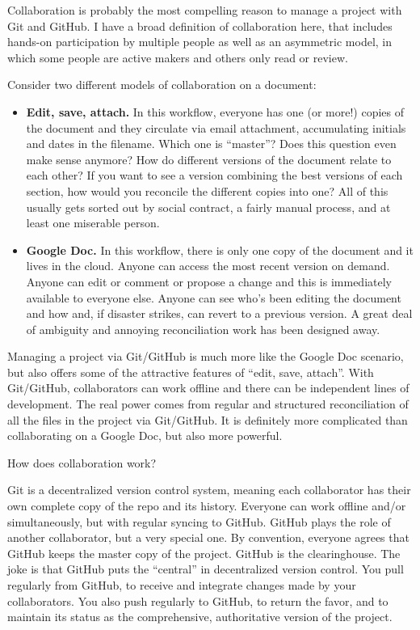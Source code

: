 \documentclass[12pt]{article}
\begin{document}
Collaboration is probably the most compelling reason to manage a project
with Git and GitHub. I have a broad definition of collaboration here,
that includes hands-on participation by multiple people as well as an
asymmetric model, in which some people are active makers and others only
read or review.

Consider two different models of collaboration on a document:

\begin{itemize}
\item
  \textbf{Edit, save, attach.} In this workflow, everyone has one (or
  more!) copies of the document and they circulate via email attachment,
  accumulating initials and dates in the filename. Which one is
  ``master''? Does this question even make sense anymore? How do
  different versions of the document relate to each other? If you want
  to see a version combining the best versions of each section, how
  would you reconcile the different copies into one? All of this usually
  gets sorted out by social contract, a fairly manual process, and at
  least one miserable person.
\item
  \textbf{Google Doc.} In this workflow, there is only one copy of the
  document and it lives in the cloud. Anyone can access the most recent
  version on demand. Anyone can edit or comment or propose a change and
  this is immediately available to everyone else. Anyone can see who's
  been editing the document and how and, if disaster strikes, can revert
  to a previous version. A great deal of ambiguity and annoying
  reconciliation work has been designed away.
\end{itemize}

Managing a project via Git/GitHub is much more like the Google Doc
scenario, but also offers some of the attractive features of ``edit,
save, attach''. With Git/GitHub, collaborators can work offline and
there can be independent lines of development. The real power comes from
regular and structured reconciliation of all the files in the project
via Git/GitHub. It is definitely more complicated than collaborating on
a Google Doc, but also more powerful.

How does collaboration work?

Git is a decentralized version control system, meaning each collaborator
has their own complete copy of the repo and its history. Everyone can
work offline and/or simultaneously, but with regular syncing to GitHub.
GitHub plays the role of another collaborator, but a very special one.
By convention, everyone agrees that GitHub keeps the master copy of the
project. GitHub is the clearinghouse. The joke is that GitHub puts the
``central'' in decentralized version control. You pull regularly from
GitHub, to receive and integrate changes made by your collaborators. You
also push regularly to GitHub, to return the favor, and to maintain its
status as the comprehensive, authoritative version of the project.
\end{document}
